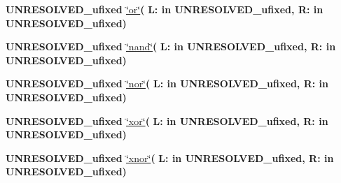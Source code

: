 \begin{DoxyCompactItemize}
\item 
{\bfseries {\bfseries \textcolor{vhdlchar}{U\+N\+R\+E\+S\+O\+L\+V\+E\+D\+\_\+ufixed}\textcolor{vhdlchar}{ }}} \hyperlink{class__fixed__pkg_a9fd278dce3b0af16ef31890aaf9688ba}{\char`\"{}or\char`\"{}}{\bfseries  ( }{\bfseries \textcolor{vhdlchar}{L\+: }\textcolor{stringliteral}{in }\textcolor{vhdlchar}{U\+N\+R\+E\+S\+O\+L\+V\+E\+D\+\_\+ufixed}}{\bfseries  , \textcolor{vhdlchar}{R\+: }\textcolor{stringliteral}{in }\textcolor{vhdlchar}{U\+N\+R\+E\+S\+O\+L\+V\+E\+D\+\_\+ufixed}}{\bfseries  )} 
\item 
{\bfseries {\bfseries \textcolor{vhdlchar}{U\+N\+R\+E\+S\+O\+L\+V\+E\+D\+\_\+ufixed}\textcolor{vhdlchar}{ }}} \hyperlink{class__fixed__pkg_a7ce0aed0c08cb035966d198c9ef8d730}{\char`\"{}nand\char`\"{}}{\bfseries  ( }{\bfseries \textcolor{vhdlchar}{L\+: }\textcolor{stringliteral}{in }\textcolor{vhdlchar}{U\+N\+R\+E\+S\+O\+L\+V\+E\+D\+\_\+ufixed}}{\bfseries  , \textcolor{vhdlchar}{R\+: }\textcolor{stringliteral}{in }\textcolor{vhdlchar}{U\+N\+R\+E\+S\+O\+L\+V\+E\+D\+\_\+ufixed}}{\bfseries  )} 
\item 
{\bfseries {\bfseries \textcolor{vhdlchar}{U\+N\+R\+E\+S\+O\+L\+V\+E\+D\+\_\+ufixed}\textcolor{vhdlchar}{ }}} \hyperlink{class__fixed__pkg_ac2bc75b25eecd34f86e413900706379c}{\char`\"{}nor\char`\"{}}{\bfseries  ( }{\bfseries \textcolor{vhdlchar}{L\+: }\textcolor{stringliteral}{in }\textcolor{vhdlchar}{U\+N\+R\+E\+S\+O\+L\+V\+E\+D\+\_\+ufixed}}{\bfseries  , \textcolor{vhdlchar}{R\+: }\textcolor{stringliteral}{in }\textcolor{vhdlchar}{U\+N\+R\+E\+S\+O\+L\+V\+E\+D\+\_\+ufixed}}{\bfseries  )} 
\item 
{\bfseries {\bfseries \textcolor{vhdlchar}{U\+N\+R\+E\+S\+O\+L\+V\+E\+D\+\_\+ufixed}\textcolor{vhdlchar}{ }}} \hyperlink{class__fixed__pkg_afa70e5bc32ddb1f0e6248a6231364f67}{\char`\"{}xor\char`\"{}}{\bfseries  ( }{\bfseries \textcolor{vhdlchar}{L\+: }\textcolor{stringliteral}{in }\textcolor{vhdlchar}{U\+N\+R\+E\+S\+O\+L\+V\+E\+D\+\_\+ufixed}}{\bfseries  , \textcolor{vhdlchar}{R\+: }\textcolor{stringliteral}{in }\textcolor{vhdlchar}{U\+N\+R\+E\+S\+O\+L\+V\+E\+D\+\_\+ufixed}}{\bfseries  )} 
\item 
{\bfseries {\bfseries \textcolor{vhdlchar}{U\+N\+R\+E\+S\+O\+L\+V\+E\+D\+\_\+ufixed}\textcolor{vhdlchar}{ }}} \hyperlink{class__fixed__pkg_a7412cd782132f28e4115a785867a1204}{\char`\"{}xnor\char`\"{}}{\bfseries  ( }{\bfseries \textcolor{vhdlchar}{L\+: }\textcolor{stringliteral}{in }\textcolor{vhdlchar}{U\+N\+R\+E\+S\+O\+L\+V\+E\+D\+\_\+ufixed}}{\bfseries  , \textcolor{vhdlchar}{R\+: }\textcolor{stringliteral}{in }\textcolor{vhdlchar}{U\+N\+R\+E\+S\+O\+L\+V\+E\+D\+\_\+ufixed}}{\bfseries  )} 

\end{DoxyCompactItemize}
